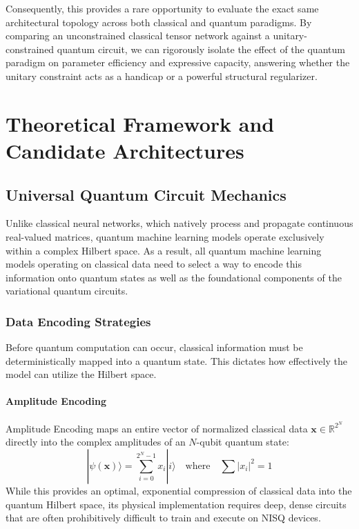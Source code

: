 \documentclass[12pt, a4paper, oneside]{report}
\begin{document}
Consequently, this provides a rare opportunity to evaluate the exact same architectural topology across both classical and quantum paradigms. By comparing an unconstrained classical tensor network against a unitary-constrained quantum circuit, we can rigorously isolate the effect of the quantum paradigm on parameter efficiency and expressive capacity, answering whether the unitary constraint acts as a handicap or a powerful structural regularizer.


\chapter{Theoretical Framework and Candidate Architectures}
\label{ch:theory}

\section{Universal Quantum Circuit Mechanics}

Unlike classical neural networks, which natively process and propagate continuous real-valued matrices, quantum machine learning models operate exclusively within a complex Hilbert space. As a result, all quantum machine learning models operating on classical data need to select a way to encode this information onto quantum states as well as the foundational components of the variational quantum circuits.

\subsection{Data Encoding Strategies}
Before quantum computation can occur, classical information must be deterministically mapped into a quantum state. This dictates how effectively the model can utilize the Hilbert space.

\subsubsection{Amplitude Encoding}
Amplitude Encoding \cite{amplitude_encoding} maps an entire vector of normalized classical data $\mathbf{x} \in \mathbb{R}^{2^N}$ directly into the complex amplitudes of an $N$-qubit quantum state:
\begin{equation}
    |\psi(\mathbf{x})\rangle = \sum_{i=0}^{2^N-1} x_i |i\rangle \quad \text{where} \quad \sum |x_i|^2 = 1
\end{equation}
While this provides an optimal, exponential compression of classical data into the quantum Hilbert space, its physical implementation requires deep, dense circuits that are often prohibitively difficult to train and execute on NISQ devices.
\end{document}
